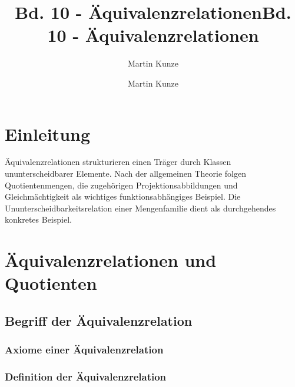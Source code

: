 \documentclass[main.tex]{subfiles}
\title{Bd. 10 - Äquivalenzrelationen}
\author{Martin Kunze}
\date{}
\begin{document}
\title{Bd. 10 - Äquivalenzrelationen}
\author{Martin Kunze}
\date{}
\hypersetup{pageanchor=false}
\maketitle
\hypersetup{pageanchor=true}
\setcounter{tocdepth}{3}
\tableofcontents
\setcounter{file}{10}
\renewcommand{\FormulaBandID}{10}

\chapter{Einleitung}

Äquivalenzrelationen strukturieren einen Träger durch Klassen
ununterscheidbarer Elemente. Nach der allgemeinen Theorie folgen
Quotientenmengen, die zugehörigen Projektionsabbildungen und
Gleichmächtigkeit als wichtiges funktionsabhängiges Beispiel. Die
Ununterscheidbarkeitsrelation einer Mengenfamilie dient als durchgehendes
konkretes Beispiel.

\chapter{Äquivalenzrelationen und Quotienten}

\section{Begriff der Äquivalenzrelation}

\subsection{Axiome einer Äquivalenzrelation}




\subsection{Definition der Äquivalenzrelation}

\end{document}
